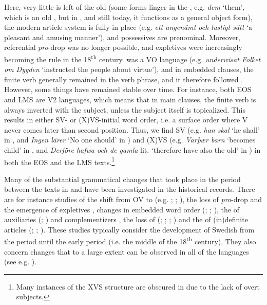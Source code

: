 \documentclass[output=paper]{langscibook}
\begin{document}
Here, very little is left of the old  (some forms linger in the , e.g. \textit{dem} ‘them’, which is an old , but in , and still today, it functions as a general object form), the modern article system is fully in place (e.g. \textit{ett angenämt och lustigt sätt} ‘a pleasant and amusing manner’), and possessives are prenominal. Moreover, referential \textit{pro}{}-drop was no longer possible, and expletives were increasingly becoming the rule in the 18\textsuperscript{th} century.  was a VO language (e.g. \textit{underwisat Folket om Dygden} ‘instructed the people about virtue’), and in embedded clauses, the finite verb generally remained in the verb phrase, and it therefore followed . However, some things have remained stable over time. For instance, both EOS and LMS are V2 languages, which means that in main clauses, the finite verb is always inverted with the subject, unless the subject itself is topicalized. This results in either SV- or (X)VS-initial word order, i.e. a surface order where V never comes later than second position. Thus, we find SV (e.g. \textit{han skal} ‘he shall’ in , and \textit{Ingen lärer} ‘No one should’ in ) and (X)VS (e.g. \textit{Varþær barn} ‘becomes child’ in , and \textit{Derföre hafwa och de gamla} lit. ‘therefore have also the old’ in ) in both the EOS and the LMS texts.\footnote{Many instances of the XVS structure are obscured in  due to the lack of overt subjects.}



Many of the substantial grammatical changes that took place in the period between the texts in  and  have been investigated in the historical records. There are for instance studies of the shift from OV to  (e.g. \citealt{Delsing1999}; \citealt{Petzell2011}; \citealt{Sangfelt2019}), the loss of \textit{pro}{}-drop \citep{Hakansson2008} and the emergence of expletives \citep{Falk1993}, changes in embedded word order (\citealt{Platzack1988centralskandinaviska}; \citealt{Falk1993}; \citealt{Hakansson2011}), the  of auxiliaries (\citealt{Andersson2007}; \citealt{Bylin2013}) and complementizers \citep{Rosenkvist2004}, the loss of  (\citealt{Delsing1991,Delsing2014Studier,Delsing1991}; \citealt{Norde1997}; \citealt{Falk1997}; \citealt{Skrzypek2005}) and the  of (in)definite articles (\citealt{Skrzypek2009}; \citealt{BrandtlerDelsing2010}; \citealt{Stroh-Wollin2016}). These studies typically consider the development of Swedish from the  period until the early  period (i.e. the middle of the 18\textsuperscript{th} century). They also concern changes that to a large extent can be observed in all of the  languages (see e.g. \citealt{HolmbergPlatzack1995}).
\end{document}
